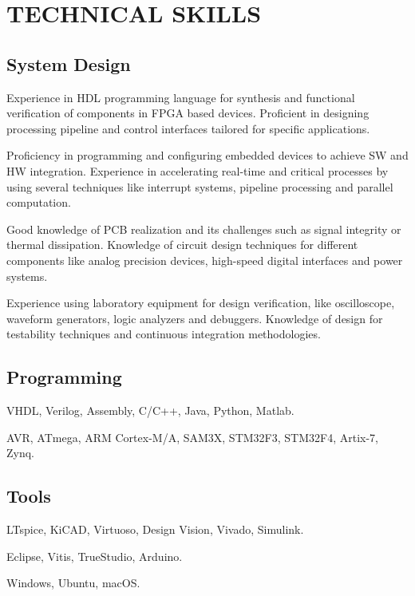 \section{TECHNICAL SKILLS}
\subsection{System Design}
\begin{description}[leftmargin=5mm]
    \item[-] Experience in HDL programming language for synthesis and functional verification of components in FPGA based devices. Proficient in designing processing pipeline and control interfaces tailored for specific applications.
    \item[-] Proficiency in programming and configuring embedded devices to achieve SW and HW integration. Experience in accelerating real-time and critical processes by using several techniques like interrupt systems, pipeline processing and parallel computation.
    \item[-] Good knowledge of PCB realization and its challenges such as signal integrity or thermal dissipation. Knowledge of circuit design techniques for different components like analog precision devices, high-speed digital interfaces and power systems.
    \item[-] Experience using laboratory equipment for design verification, like oscilloscope, waveform generators, logic analyzers and debuggers. Knowledge of design for testability techniques and continuous integration methodologies.
\end{description}
\subsection{Programming}
\begin{description}[leftmargin=5mm]
    \item[- Languages:] VHDL, Verilog, Assembly, C/C++, Java, Python, Matlab.
    \item[- Devices:] AVR, ATmega, ARM Cortex-M/A, SAM3X, STM32F3, STM32F4, Artix-7, Zynq.
\end{description}

\subsection{Tools}
\begin{description}[leftmargin=5mm]
    \item[- CAD:] LTspice, KiCAD, Virtuoso, Design Vision, Vivado, Simulink.
    \item[- IDE:] Eclipse, Vitis, TrueStudio, Arduino.
    \item[- OS:] Windows, Ubuntu, macOS.
\end{description}